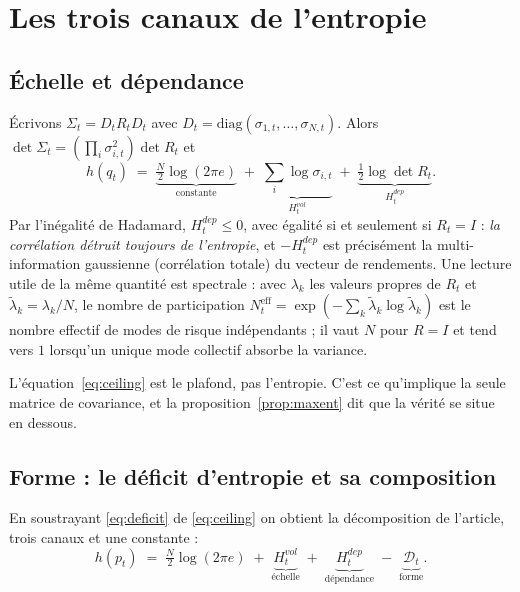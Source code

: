 \documentclass[11pt]{article}
\theoremstyle{definition}
\theoremstyle{remark}
\newcommand{\DD}{\mathcal{D}}
\begin{document}
\section{Les trois canaux de l'entropie}
\label{sec:channels}

\subsection{Échelle et dépendance}

Écrivons $\Sigma_t = D_tR_tD_t$ avec
$D_t=\mathrm{diag}(\sigma_{1,t},\dots,\sigma_{N,t})$. Alors
$\det\Sigma_t = \left(\prod_i\sigma_{i,t}^2\right)\det R_t$ et
\begin{equation}
\label{eq:ceiling}
h(q_t) \;=\; \underbrace{\tfrac{N}{2}\log(2\pi e)}_{\text{constante}}
\;+\; \underbrace{\sum_i \log\sigma_{i,t}}_{H^{vol}_t}
\;+\; \underbrace{\tfrac12\log\det R_t}_{H^{dep}_t}.
\end{equation}
Par l'inégalité de Hadamard, $H^{dep}_t\le 0$, avec égalité si et seulement si
$R_t=I$ : \emph{la corrélation détruit toujours de l'entropie}, et $-H^{dep}_t$
est précisément la multi-information gaussienne (corrélation totale) du vecteur
de rendements. Une lecture utile de la même quantité est spectrale : avec
$\lambda_k$ les valeurs propres de $R_t$ et $\tilde\lambda_k=\lambda_k/N$, le
nombre de participation
$N^{\text{eff}}_t=\exp\!\left(-\sum_k\tilde\lambda_k\log\tilde\lambda_k\right)$
est le nombre effectif de modes de risque indépendants ; il vaut $N$ pour $R=I$
et tend vers $1$ lorsqu'un unique mode collectif absorbe la variance.

L'équation~\eqref{eq:ceiling} est le plafond, pas l'entropie. C'est ce
qu'implique la seule matrice de covariance, et la proposition~\ref{prop:maxent}
dit que la vérité se situe en dessous.

\subsection{Forme : le déficit d'entropie et sa composition}

En soustrayant \eqref{eq:deficit} de \eqref{eq:ceiling} on obtient la
décomposition de l'article, trois canaux et une constante :
\begin{equation}
\label{eq:three}
h(p_t) \;=\; \tfrac{N}{2}\log(2\pi e) \;+\; \underbrace{H^{vol}_t}_{\text{échelle}} \;+\; \underbrace{H^{dep}_t}_{\text{dépendance}} \;-\; \underbrace{\DD_t}_{\text{forme}}.
\end{equation}
\end{document}
